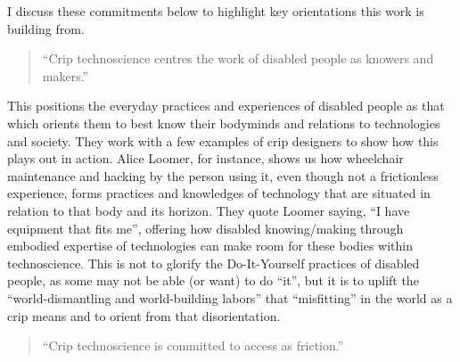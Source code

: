 I discuss these commitments below to highlight key orientations this
work is building from.

\begin{quote}
``Crip technoscience centres the work of disabled people as knowers and
makers.''
\end{quote}

This positions the everyday practices and experiences of disabled people
as that which orients them to best know their bodyminds and relations to
technologies and society. They work with a few examples of crip
designers to show how this plays out in action. Alice Loomer, for
instance, shows us how wheelchair maintenance and hacking by the person
using it, even though not a frictionless experience, forms practices and
knowledges of technology that are situated in relation to that body and
its horizon. They quote Loomer saying, ``I have equipment that fits
me'', offering how disabled knowing/making through embodied expertise of
technologies can make room for these bodies within technoscience. This
is not to glorify the Do-It-Yourself practices of disabled people, as
some may not be able (or want) to do ``it'', but it is to uplift the
``world-dismantling and world-building labors'' that ``misfitting'' in
the world as a crip means and to orient from that disorientation.

\begin{quote}
``Crip technoscience is committed to access as friction.''
\end{quote}


